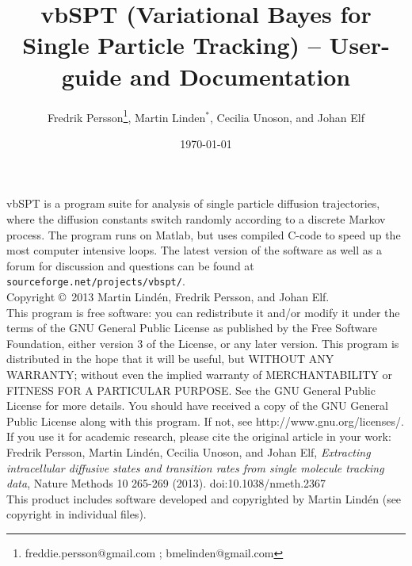\documentclass[11pt,a4paper]{article}
\title{vbSPT (Variational Bayes for Single Particle Tracking) -- User-guide and Documentation}
\author{Fredrik Persson\footnote{freddie.persson@gmail.com ; bmelinden@gmail.com},
Martin Linden$^*$, Cecilia Unoson, and Johan Elf}
\date{\today}
\begin{document}
\maketitle 

\noindent vbSPT is a program suite for analysis of single particle diffusion
trajectories, where the diffusion constants switch randomly according
to a discrete Markov process. The program runs on Matlab, but uses
compiled C-code to speed up the most computer intensive loops.  The
latest version of the software as well as a forum for discussion and
questions can be found at \verb+sourceforge.net/projects/vbspt/+.\medskip\\

\noindent Copyright \copyright \  2013 Martin Lind\'en, Fredrik Persson, and
Johan Elf.\medskip\\
 
\noindent This program is free software: you can redistribute it
and/or modify it under the terms of the GNU General Public License as
published by the Free Software Foundation, either version 3 of the
License, or any later version.  This program is distributed in the
hope that it will be useful, but WITHOUT ANY WARRANTY; without even
the implied warranty of MERCHANTABILITY or FITNESS FOR A PARTICULAR
PURPOSE. See the GNU General Public License for more details. You
should have received a copy of the GNU General Public License along
with this program. If not, see http://www.gnu.org/licenses/.\medskip\\

\noindent If you use it for academic research, please cite the
original article in your work:\medskip\\
\noindent Fredrik Persson, Martin Lind\'en, Cecilia Unoson, and Johan
Elf, \emph{Extracting intracellular diffusive states and transition
  rates from single molecule tracking data}, Nature Methods 10 265-269
(2013). doi:10.1038/nmeth.2367 \medskip\\

\noindent  This product includes software developed and copyrighted by Martin
Lind\'en (see copyright in individual files). 
\end{document}
